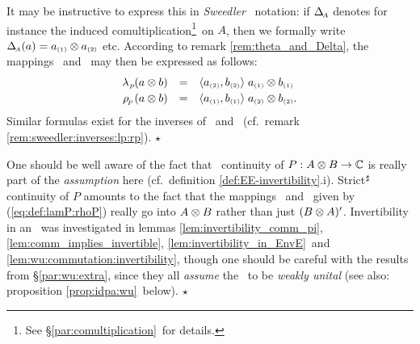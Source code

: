 \begin{remark_sec} \rm
It may be instructive to express this in {\em Sweedler\/} \cite{Sweedler}\ notation:
if $\Delta_{\scriptscriptstyle \! A}$ denotes for instance the induced
comultiplication\footnote{See \S \ref{par:comultiplication}\ for details.}\ on $A$,
then we formally write $\Delta_{\scriptscriptstyle \! A}(a) = {a}_{\scriptscriptstyle (1)} \otimes {a}_{\scriptscriptstyle (2)}$ etc.
According to remark \ref{rem:theta_and_Delta},
the mappings \lp\ and \rp\ may then be expressed as follows:
$$\begin{array}{rcl}
     \lp(a \tens b)  &=&        \pair{\sweed{a}{2}}{\sweed{b}{2}}
                             \; \sweed{a}{1} \tens \sweed{b}{1}
     \\
     \rp(a \tens b)  &=&  \pair{\sweed{a}{1}}{\sweed{b}{1}}
                             \; \sweed{a}{2} \tens  \sweed{b}{2}.\vertL
   \end{array} $$
Similar formulas exist for the inverses of \lp\ and \rp\
(cf.\ remark \ref{rem:sweedler:inverses:lp:rp}).
\hfill $\star$
\end{remark_sec}



\begin{remark_sec}\label{rem:warning:P_strict_cont}  \rm
One should be well aware of the fact that \stricta\ continuity of $P : A \otimes B \rightarrow \mathbb{C}$
is really part of the {\em assumption\/} here (cf.\ definition \ref{def:EE-invertibility}.i).
Strict$^\sharp$ continuity of $P$ amounts to the fact that the mappings \lp\ and \rp\
given by (\ref{eq:def:lamP:rhoP}) really go into $A \otimes B$ rather than just $(B \otimes A)'$.
Invertibility in an \context\ was investigated in
lemmas \ref{lem:invertibility_comm_pi}, \ref{lem:comm_implies_invertible},
\ref{lem:invertibility_in_EnvE}\ and \ref{lem:wu:commutation:invertibility},
though one should be careful with the results from \S\ref{par:wu:extra},
since they all {\em assume\/} the \context\ to be {\em weakly unital\/}
(see also: proposition \ref{prop:idpa:wu}\ below).
\hfill $\star$
\end{remark_sec}


